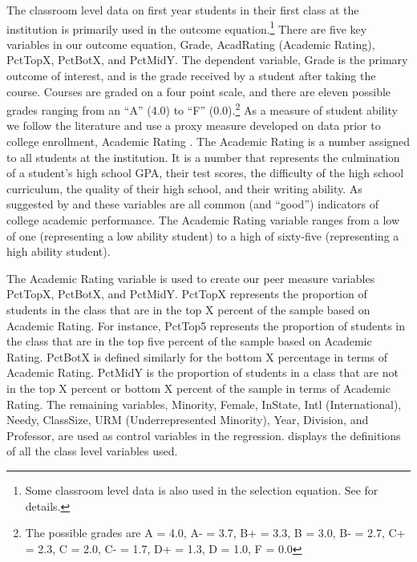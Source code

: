 The classroom level data on first year students in their first class at the institution is primarily used in the outcome equation.\footnote{Some classroom level data is also used in the selection equation. See  for details.}
There are five key variables in our outcome equation, Grade, AcadRating (Academic Rating), PctTopX, PctBotX, and PctMidY. 
The dependent variable, Grade is the primary outcome of interest, and is the grade received by a student after taking the course. 
Courses are graded on a four point scale, and there are eleven possible grades ranging from an ``A'' (4.0) to ``F'' (0.0).\footnote{The possible grades are A = 4.0, A- = 3.7, B+ = 3.3, B = 3.0, B- = 2.7, C+ = 2.3, C = 2.0, C- = 1.7, D+ = 1.3, D = 1.0, F = 0.0} 
As a measure of student ability we follow the literature and use a proxy measure developed on data prior to college enrollment, Academic Rating \citep{griffith2014peer,smith2015new}. 
The Academic Rating is a number assigned to all students at the institution. 
It is a number that represents the culmination of a student's high school GPA, their test scores, the difficulty of the high school curriculum, the quality of their high school, and their writing ability. 
As suggested by \citet{betts2003determinants} and \citet{dooley2012persistence} these variables are all common (and ``good'') indicators of college academic performance.
The Academic Rating variable ranges from a low of one (representing a low ability student) to a high of sixty-five (representing a high ability student).

The Academic Rating variable is used to create our peer measure variables PctTopX, PctBotX, and PctMidY. 
PctTopX represents the proportion of students in the class that are in the top X percent of the sample based on Academic Rating. 
For instance, PctTop5 represents the proportion of students in the class that are in the top five percent of the sample based on Academic Rating.
PctBotX is defined similarly for the bottom X percentage in terms of Academic Rating. 
PctMidY is the proportion of students in a class that are not in the top X percent or bottom X percent of the sample in terms of Academic Rating. 
The remaining variables, Minority, Female, InState, Intl (International), Needy, ClassSize, URM (Underrepresented Minority), Year, Division, and Professor, are used as control variables in the regression.
 displays the definitions of all the class level variables used. 

\clearpage{}

